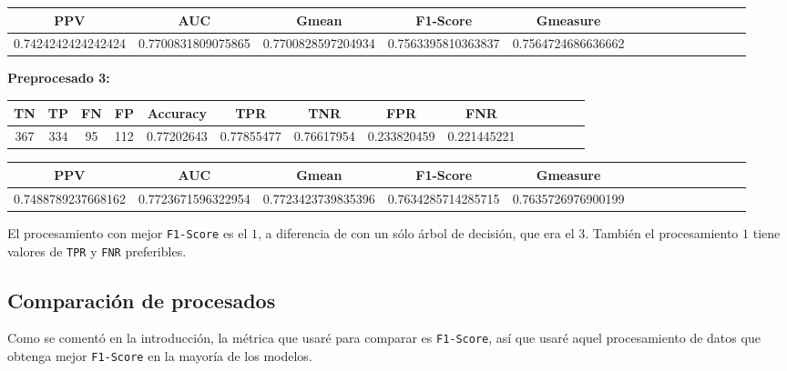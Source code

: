 \documentclass[a4]{article}
\begin{document}
\begin{center}
\begin{tabular}{|c|c|c|c|c|c|c|c|c|c|c|c|c|c|}
\hline
\multicolumn{1}{|c|}{\textbf{PPV}} & \textbf{AUC} & \textbf{Gmean} & \textbf{F1-Score} & \textbf{Gmeasure}  \\ \hline
  0.7424242424242424 & 0.7700831809075865 & 0.7700828597204934 & 0.7563395810363837 & 0.7564724686636662 \\ \hline
\end{tabular}
\end{center}

\textbf{Preprocesado 3:}
\begin{center}
\begin{tabular}{|c|c|c|c|c|c|c|c|c|c|c|c|c|c|}
\hline
\multicolumn{1}{|c|}{\textbf{TN}}& \textbf{TP} & \textbf{FN} & \textbf{FP} & \textbf{Accuracy} & \textbf{TPR} & \textbf{TNR} & \textbf{FPR} &\textbf{FNR} \\ \hline
  367 & 334 & 95 & 112 & 0.77202643 & 0.77855477 & 0.76617954 & 0.233820459 & 0.221445221 \\ \hline
\end{tabular}
\end{center}

\begin{center}
\begin{tabular}{|c|c|c|c|c|c|c|c|c|c|c|c|c|c|}
\hline
\multicolumn{1}{|c|}{\textbf{PPV}} & \textbf{AUC} & \textbf{Gmean} & \textbf{F1-Score} & \textbf{Gmeasure}  \\ \hline
  0.7488789237668162 & 0.7723671596322954 & 0.7723423739835396 & 0.7634285714285715 & 0.7635726976900199 \\ \hline
\end{tabular}
\end{center}

El procesamiento con mejor \texttt{F1-Score} es el $1$, a diferencia de con un sólo árbol de decisión, que era el $3$. También el procesamiento $1$ tiene valores de \texttt{TPR} y \texttt{FNR} preferibles.

\subsection{Comparación de procesados}

Como se comentó en la introducción, la métrica que usaré para comparar es \texttt{F1-Score}, así que usaré aquel procesamiento de datos que obtenga mejor \texttt{F1-Score} en la mayoría de los modelos.
\end{document}

